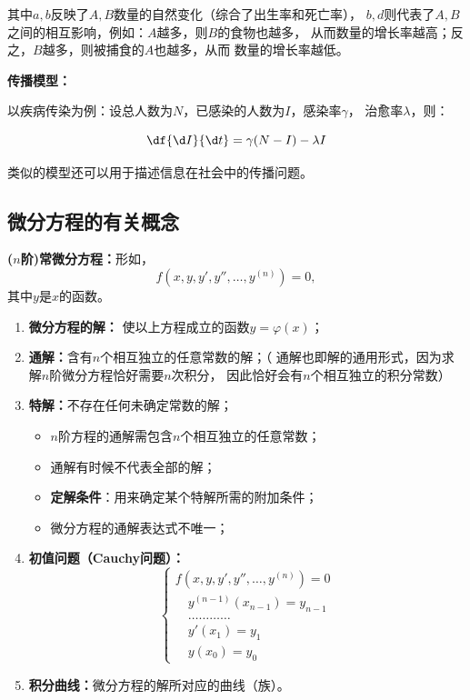 其中$a,b$反映了$A,B$数量的自然变化（综合了出生率和死亡率），
$b,d$则代表了$A,B$之间的相互影响，例如：$A$越多，则$B$的食物也越多，
从而数量的增长率越高；反之，$B$越多，则被捕食的$A$也越多，从而
数量的增长率越低。

{\bf 传播模型：}

以疾病传染为例：设总人数为$N$，已感染的人数为$I$，感染率$\gamma$，
治愈率$\lambda$，则：

$$\df{\d I}{\d t}=\gamma (N-I)-\lambda I$$

类似的模型还可以用于描述信息在社会中的传播问题。

\subsection{微分方程的有关概念}

\begin{thx}
	{\bf ($n$阶)常微分方程：}形如，
	$$f(x,y,y',y'',\ldots,y^{(n)})=0,$$
	其中$y$是$x$的函数。
	\begin{enumerate}[(1)]
	  \setlength{\itemindent}{1cm}
	  \item {\bf 微分方程的解：} 使以上方程成立的函数$y=\varphi(x)$； 
	  \item {\bf 通解：}含有$n$个相互独立的任意常数的解；（{\kaishu 
	  通解也即解的通用形式，因为求解$n$阶微分方程恰好需要$n$次积分，
	  因此恰好会有$n$个相互独立的积分常数}）
	  \item {\bf 特解：}不存在任何未确定常数的解； 
	  \begin{itemize}
	    \item $n$阶方程的通解需包含$n$个相互独立的任意常数；
	    \item 通解有时候不代表全部的解；
	    \item {\bf 定解条件}：用来确定某个特解所需的附加条件；
	    \item 微分方程的通解表达式不唯一；
	  \end{itemize} 
	  \item {\bf 初值问题（Cauchy问题）：}
	  $$
	  \left\{\begin{array}{l}
	  	f(x,y,y',y'',\ldots,y^{(n)})=0\\
	  	\quad{y^{(n-1)}(x_{n-1})=y_{n-1}}\\
	  	\quad{\ldots\ldots\ldots\ldots}\\
	  	\quad{y'(x_1)=y_1}\\
	  	\quad{y(x_0)=y_0}
	  \end{array}\right.
	  $$
	  \item {\bf 积分曲线：}微分方程的解所对应的曲线（族）。
	\end{enumerate}
\end{thx}

